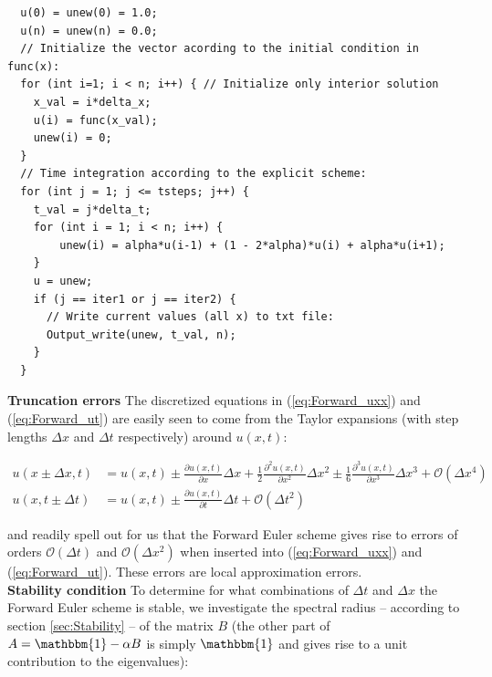 \documentclass[a4paper, 11pt, notitlepage,english]{article}
\newcommand{\id}{\mathbbm{1}}
\begin{document}
\begin{center}
\begin{lstlisting}
  u(0) = unew(0) = 1.0;
  u(n) = unew(n) = 0.0;
  // Initialize the vector acording to the initial condition in func(x):
  for (int i=1; i < n; i++) { // Initialize only interior solution
  	x_val = i*delta_x;
  	u(i) = func(x_val);
  	unew(i) = 0;
  }
  // Time integration according to the explicit scheme:
  for (int j = 1; j <= tsteps; j++) {
  	t_val = j*delta_t;
  	for (int i = 1; i < n; i++) {
  		unew(i) = alpha*u(i-1) + (1 - 2*alpha)*u(i) + alpha*u(i+1);
  	}
  	u = unew;
  	if (j == iter1 or j == iter2) {
  	  // Write current values (all x) to txt file:
  	  Output_write(unew, t_val, n);
    }
  }
\end{lstlisting}
\end{center}

\textbf{Truncation errors} \newline
The discretized equations in (\ref{eq:Forward_uxx}) and (\ref{eq:Forward_ut}) are easily seen to come from the Taylor expansions (with step lengths $\Delta x$ and $\Delta t$ respectively) around $u(x,t)$:

\begin{align}
u(x\pm\Delta x,t) &= u(x,t) \pm \frac{\partial u(x,t)}{\partial x}\Delta x + \frac{1}{2}\frac{\partial^2 u(x,t)}{\partial x^2}\Delta x^2 \pm \frac{1}{6}\frac{\partial^3 u(x,t)}{\partial x^3}\Delta x^3 +  \mathcal{O}(\Delta x^4)
\label{eq:Forward_Euler_expansions1} \\
u(x,t\pm \Delta t) &= u(x,t) \pm \frac{\partial u(x,t)}{\partial t}\Delta t + \mathcal{O}(\Delta t^2)
\label{eq:Forward_Euler_expansions2}
\end{align}

and readily spell out for us that the Forward Euler scheme gives rise to errors of orders $\mathcal{O}(\Delta t)$ and $\mathcal{O}(\Delta x^2)$ when inserted into (\ref{eq:Forward_uxx}) and (\ref{eq:Forward_ut}). These errors are local approximation errors. \\


\textbf{Stability condition} \newline
To determine for what combinations of $\Delta t$ and $\Delta x$ the Forward Euler scheme is stable, we investigate the spectral radius – according to section \ref{sec:Stability} – of the matrix $B$ (the other part of $A = \id - \alpha B$ is simply $\id$ and gives rise to a unit contribution to the eigenvalues):
\end{document}
